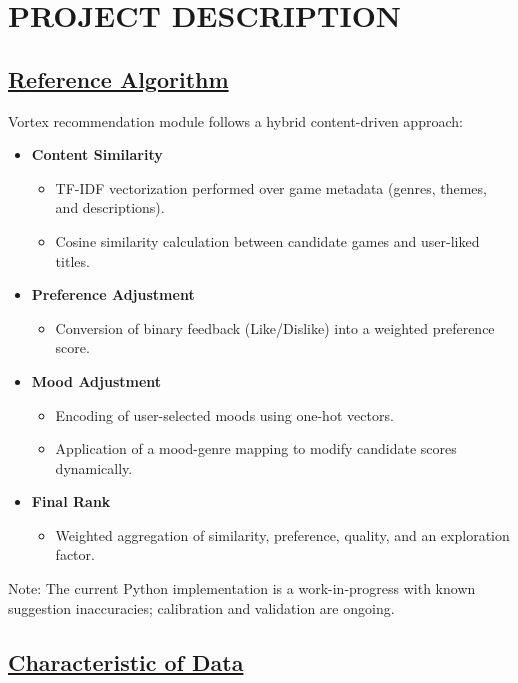 \section{PROJECT DESCRIPTION}

\subsection{\underline{Reference Algorithm}}
Vortex recommendation module follows a hybrid content-driven approach: 

\begin{itemize}
    \item \textbf{Content Similarity}
    \begin{itemize}
        \item TF-IDF vectorization performed over game metadata (genres, themes, and descriptions).
        \item Cosine similarity calculation between candidate games and user-liked titles.
    \end{itemize}

    \item \textbf{Preference Adjustment}
    \begin{itemize}
        \item Conversion of binary feedback (Like/Dislike) into a weighted preference score.
    \end{itemize}

    \item \textbf{Mood Adjustment}
    \begin{itemize}
        \item Encoding of user-selected moods using one-hot vectors.
        \item Application of a mood-genre mapping to modify candidate scores dynamically.
    \end{itemize}

    \item \textbf{Final Rank}
    \begin{itemize}
        \item Weighted aggregation of similarity, preference, quality, and an exploration factor.
    \end{itemize}
\end{itemize}

Note: The current Python implementation is a work-in-progress with known suggestion inaccuracies; calibration and validation are ongoing.


\subsection{\underline{Characteristic of Data}}

